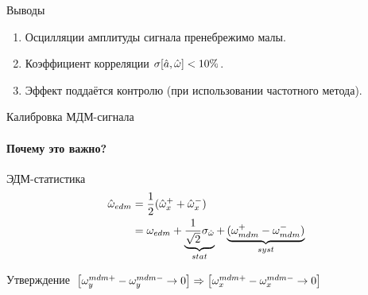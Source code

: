 \documentclass[14pt]{beamer}
\begin{document}
\begin{frame}\centering
{}
\end{frame}

\begin{frame}{Выводы}
\begin{enumerate}
\item Осцилляции амплитуды сигнала пренебрежимо малы.
\item Коэффициент корреляции $\sigma[\hat a, \hat{\omega}] < 10\%$.
\item Эффект поддаётся контролю (при использовании частотного метода).
\end{enumerate}
\end{frame}

\begin{frame}{Калибровка МДМ-сигнала}
\framesubtitle{Почему это важно?}
\begin{block}{ЭДМ-статистика}
	\begin{align*}
		\hat{\omega}_{edm} &= \frac12(\hat{\omega}_x^+ + \hat{\omega}_x^-) \\
		&= \omega_{edm} + \underbrace{\frac{1}{\sqrt2}\sigma_{\hat{\omega}}}_{stat} + \underbrace{(\omega_{mdm}^+ - \omega_{mdm}^-)}_{syst}
	\end{align*}
\end{block}
\begin{block}{Утверждение}
	$\left[\omega_y^{mdm+} - \omega_y^{mdm-} \to 0\right] \Rightarrow \left[\omega_x^{mdm+} - \omega_x^{mdm-} \to 0\right]$
\end{block}
\end{frame}
\end{document}

